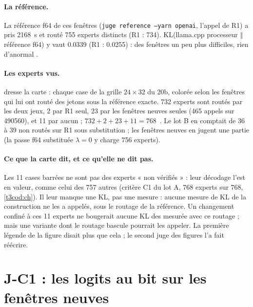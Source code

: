 \paragraph{La référence.} La référence f64 de ces fenêtres (\texttt{juge reference --yarn openai}, l'appel de R1) a pris \SI{2168}{\second} et routé \num{755} experts distincts (R1 : 734). KL(llama.cpp processeur $\Vert$ référence f64) y vaut \num{0.0339} (R1 : \num{0.0255}) : des fenêtres un peu plus difficiles, rien d'anormal \mes.

\paragraph{Les experts vus.}  dresse la carte : chaque case de la grille $24 \times 32$ du 20b, colorée selon les fenêtres qui lui ont routé des jetons sous la référence exacte. 732 experts sont routés par les deux jeux, 2 par R1 seul, 23 par les fenêtres neuves seules (\num{465} appels sur \num{490560}), et 11 par aucun ; $732 + 2 + 23 + 11 = 768$ \mes\,\calc. Le lot B en comptait de 36 à 39 non routés sur R1 sous substitution ; les fenêtres neuves en jugent une partie (la passe f64 substituée $\lambda = 0$ y charge 756 experts).

\begin{figure}[tbp]
\centering
\GrapheJconsExperts
{}
\label{fig:t3-jcons-experts}
\end{figure}

\paragraph{Ce que la carte dit, et ce qu'elle ne dit pas.} Les 11 cases barrées ne sont pas des experts « non vérifiés » : leur décodage l'est en valeur, comme celui des 757 autres (critère C1 du lot A, 768 experts sur 768, \cref{t3cod:ch}). Il leur manque une KL, pas une mesure : aucune mesure de KL de la construction ne les a appelés, sous le routage de la référence. Un changement confiné à ces 11 experts ne bougerait aucune KL des  mesurée avec ce routage ; mais une variante dont le routage bascule pourrait les appeler. La première légende de la figure disait plus que cela ; le second juge des figures l'a fait réécrire.

\section{J-C1 : les logits au bit sur les fenêtres neuves}\label{t3jug:sec:jc1}

